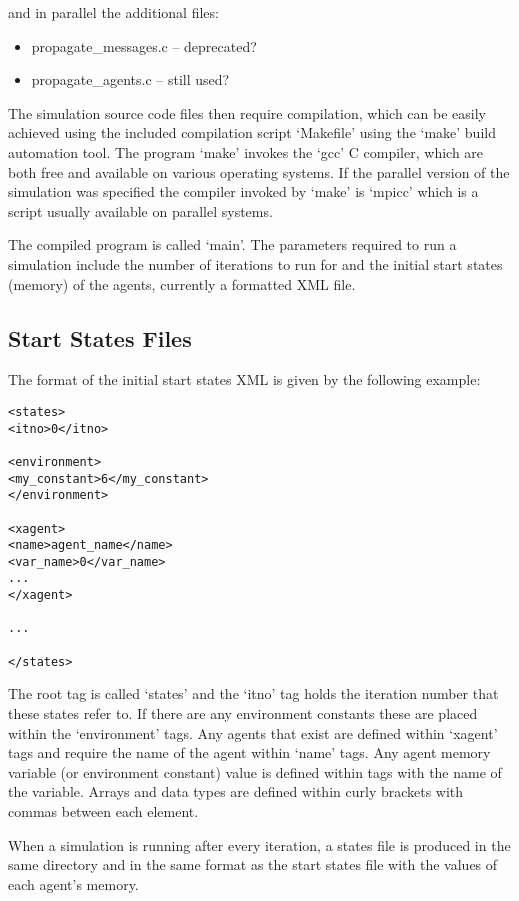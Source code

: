 and in parallel the additional files:

\begin{itemize}
  \item propagate\_messages.c -- deprecated?
  \item propagate\_agents.c -- still used?
\end{itemize}

The simulation source code files then require compilation, which can be easily
achieved using the included compilation script `Makefile' using the `make'
build automation tool. The program `make' invokes the `gcc' C compiler, which
are both free and available on various operating systems. If the parallel
version of the simulation was specified the compiler invoked by `make' is
`mpicc' which is a script usually available on parallel systems.

The compiled program is called `main'. The parameters required to run a
simulation include the number of iterations to run for and the initial start
states (memory) of the agents, currently a formatted XML file.

\subsection{Start States Files}

The format of the initial start states XML is given by the following example:

\begin{mylisting}
\begin{verbatim}
<states>
<itno>0</itno>

<environment>
<my_constant>6</my_constant>
</environment>

<xagent>
<name>agent_name</name>
<var_name>0</var_name>
...
</xagent>

...

</states>
\end{verbatim}
\end{mylisting}

The root tag is called `states' and the `itno' tag holds the iteration number
that these states refer to. If there are any environment constants these are
placed within the `environment' tags. Any agents that exist are defined within
`xagent' tags and require the name of the agent within `name' tags. Any agent
memory variable (or environment constant) value is defined within tags with
the name of the variable. Arrays and data types are defined within curly
brackets with commas between each element.

When a simulation is running after every iteration, a states file is produced
in the same directory and in the same format as the start states file with the
values of each agent's memory.

